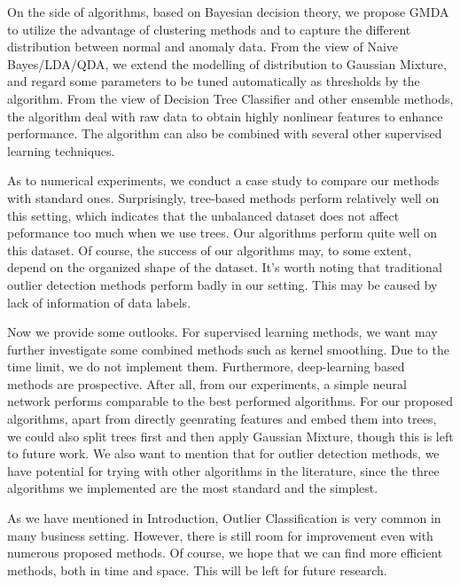 \documentclass[english]{article}
\begin{document}
\par On the side of algorithms, based on Bayesian decision theory, we propose GMDA to utilize the advantage of clustering methods and to capture the different distribution between normal and anomaly data. From the view of Naive Bayes/LDA/QDA, we extend the modelling of distribution to Gaussian Mixture, and regard some parameters to be tuned automatically as thresholds by the algorithm. From the view of Decision Tree Classifier and other ensemble methods, the algorithm deal with raw data to obtain highly nonlinear features to enhance performance. The algorithm can also be combined with several other supervised learning techniques.

\par As to numerical experiments, we conduct a case study to compare our methods with standard ones. Surprisingly, tree-based methods perform relatively well on this setting, which indicates that the unbalanced dataset does not affect peformance too much when we use trees. Our algorithms perform quite well on this dataset. Of course, the success of our algorithms may, to some extent, depend on the organized shape of the dataset. It's worth noting that traditional outlier detection methods perform badly in our setting. This may be caused by lack of information of data labels.

\par Now we provide some outlooks. For supervised learning methods, we want may further investigate some combined methods such as kernel smoothing. Due to the time limit, we do not implement them. Furthermore, deep-learning based methods are prospective. After all, from our experiments, a simple neural network performs comparable to the best performed algorithms. For our proposed algorithms, apart from directly geenrating features and embed them into trees, we could also split trees first and then apply Gaussian Mixture, though this is left to future work. We also want to mention that for outlier detection methods, we have potential for trying with other algorithms in the literature, since the three algorithms we implemented are the most standard and the simplest.

\par As we have mentioned in Introduction, Outlier Classification is very common in many business setting. However, there is still room for improvement even with numerous proposed methods. Of course, we hope that we can find more efficient methods, both in time and space. This will be left for future research.
\end{document}
